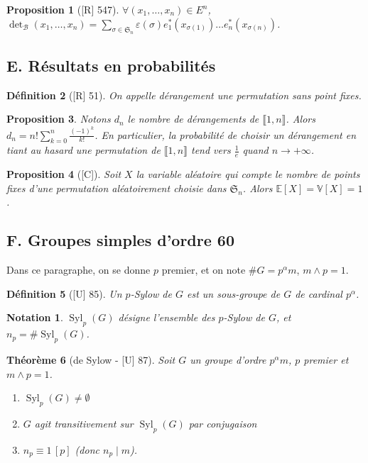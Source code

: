 \documentclass[10pt, a4paper, parskip=full, twoside, twocolumn]{report}
\newtheorem{definition}{Définition}
\newtheorem{theorem}[definition]{Théorème}
\newtheorem{proposition}[definition]{Proposition}
\newtheorem*{notation*}{Notation}
\DeclareMathOperator{\Syl}{Syl}
\begin{document}
\begin{proposition}[\textnormal{[R] 547}]
	$\forall(x_1,\dots, x_n)\in E^n$, $\det_{\mathcal{B}}(x_1,\dots,x_n) = \sum_{\sigma\in\mathfrak{S}_n} \varepsilon(\sigma)e_1^*(x_{\sigma(1)})\dots e_n^*(x_{\sigma(n)})$.
\end{proposition}

\subsection*{E. Résultats en probabilités}

\begin{definition}[\textnormal{[R] 51}]
	On appelle \emph{dérangement} une permutation sans point fixes.
\end{definition}

\begin{proposition}
	Notons $d_n$ le nombre de dérangements de $\llbracket 1,n\rrbracket$.
	Alors $d_n = n!\sum_{k=0}^{n}\frac{(-1)^k}{k!}$. En particulier, la probabilité
	de choisir un dérangement en tiant au hasard une permutation de $\llbracket 1,n\rrbracket$ tend vers $\frac{1}{e}$ quand $n\to +\infty$.
\end{proposition}

\begin{proposition}[\textnormal{[C]}]
	Soit $X$ la variable aléatoire qui compte le nombre de points fixes d'une permutation aléatoirement choisie dans $\mathfrak{S}_n$.
	Alors $\mathbb{E}[X] = \mathbb{V}[X] = 1$.
\end{proposition}

\subsection*{F. Groupes simples d'ordre 60}
Dans ce paragraphe, on se donne $p$ premier, et on note $\#G = p^{\alpha}m$, $m\wedge p = 1$.

\begin{definition}[\textnormal{[U] 85}]
	Un \emph{$p$-Sylow} de $G$ est un sous-groupe de $G$ de cardinal $p^{\alpha}$.
\end{definition}

\begin{notation*}
	$\Syl_p(G)$ désigne l'ensemble des $p$-Sylow de $G$, et $n_p =\#\Syl_p(G)$.
\end{notation*}

\begin{theorem}[de Sylow - \textnormal{[U] 87}]
	Soit $G$ un groupe d'ordre $p^{\alpha}m$, $p$ premier et $m\wedge p = 1$.
	\begin{enumerate}
		\item $\Syl_p(G)\neq \emptyset$
		\item $G$ agit transitivement sur $\Syl_p(G)$ par conjugaison
		\item $n_p \equiv 1\,[p]$ (donc $n_p\mid m$).
	\end{enumerate}
\end{theorem}
\end{document}
